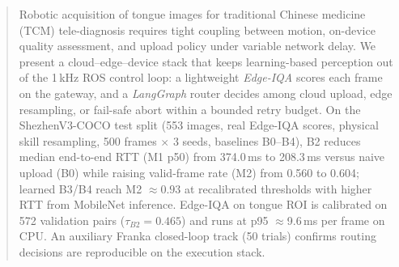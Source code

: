 \begin{abstract}
Robotic acquisition of tongue images for traditional Chinese medicine (TCM) tele-diagnosis requires tight coupling between motion, on-device quality assessment, and upload policy under variable network delay.
We present a cloud--edge--device stack that keeps learning-based perception out of the 1\,kHz ROS control loop: a lightweight \emph{Edge-IQA} scores each frame on the gateway, and a \emph{LangGraph} router decides among cloud upload, edge resampling, or fail-safe abort within a bounded retry budget.
On the ShezhenV3-COCO test split (553 images, real Edge-IQA scores, physical skill resampling, 500 frames $\times$ 3 seeds, baselines B0--B4), B2 reduces median end-to-end RTT (M1 p50) from 374.0\,ms to 208.3\,ms versus naive upload (B0) while raising valid-frame rate (M2) from 0.560 to 0.604; learned B3/B4 reach M2 $\approx 0.93$ at recalibrated thresholds with higher RTT from MobileNet inference.
Edge-IQA on tongue ROI is calibrated on 572 validation pairs ($\tau_{B2}{=}0.465$) and runs at p95 $\approx$9.6\,ms per frame on CPU.
An auxiliary Franka closed-loop track (50 trials) confirms routing decisions are reproducible on the execution stack.
\end{abstract}
